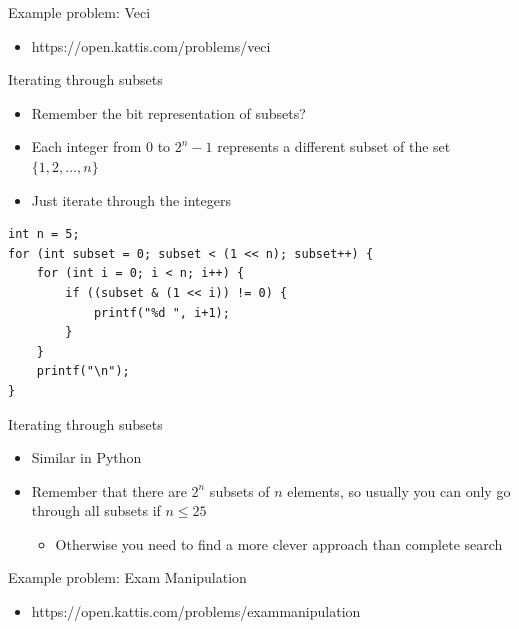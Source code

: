 \documentclass{beamer}
\begin{document}
\begin{frame}[plain]{Example problem: Veci}
    \begin{itemize}
        \item https://open.kattis.com/problems/veci
    \end{itemize}
\end{frame}

\begin{frame}{Iterating through subsets}
    \begin{itemize}
        \item Remember the bit representation of subsets?
        \item Each integer from $0$ to $2^n - 1$ represents a different subset of the set $\{1,2,\ldots,n\}$
        \item Just iterate through the integers
    \end{itemize}

            \begin{verbatim}
int n = 5;
for (int subset = 0; subset < (1 << n); subset++) {
    for (int i = 0; i < n; i++) {
        if ((subset & (1 << i)) != 0) {
            printf("%d ", i+1);
        }
    }
    printf("\n");
}
            \end{verbatim}
\end{frame}

\begin{frame}[plain]{Iterating through subsets}
    \begin{itemize}
        \item Similar in Python
        \vspace{20pt}
        \item Remember that there are $2^n$ subsets of $n$ elements, so usually you can only go through all subsets if $n \leq 25$
            \begin{itemize}
                \item Otherwise you need to find a more clever approach than complete search
            \end{itemize}
            \vspace{20pt}
    \end{itemize}
\end{frame}

\begin{frame}[plain]{Example problem: Exam Manipulation}
    \begin{itemize}
        \item https://open.kattis.com/problems/exammanipulation
    \end{itemize}
\end{frame}
\end{document}
